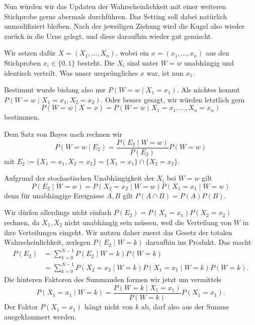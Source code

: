 \documentclass[8pt]{beamer}
\newcommand{\parspace}{\vspace{0.8em}}
\begin{document}
\begin{frame}
Nun würden wir das Updaten der Wahrscheinlichkeit mit einer weiteren
Stichprobe gerne abermals durchführen. Das Setting soll dabei natürlich
unmodifiziert bleiben. Nach der jeweiligen Ziehung wird die Kugel also
wieder zurück in die Urne gelegt, und diese daraufhin wieder gut gemischt.\pause

\parspace
Wir setzen dafür $X=(X_1,\ldots,X_n)$, wobei ein $x=(x_1,\ldots,x_n)$
aus den Stichproben $x_i\in\{0,1\}$ besteht. Die $X_i$ sind unter $W=w$
unabhängig und identisch verteilt. Was unser ursprüngliches $x$ war,
ist nun $x_1$.\pause

\parspace
Bestimmt wurde bislang also nur $P(W=w\mid X_1=x_1)$. Als nächtes kommt
$P(W=w\mid X_1=x_1, X_2=x_2)$. Oder besser gesagt, wir würden letztlich gern
\[P(W=w\mid X=x) = P(W=w\mid X_1=x_1,\ldots, X_n=x_n)\]
bestimmen.
\end{frame}

\begin{frame}
Dem Satz von Bayes nach rechnen wir
\[P(W=w\mid E_2) = \frac{P(E_2\mid W=w)}{P(E_2)}P(W=w)\]
mit $E_2 := \{X_1=x_1,X_2=x_2\} = \{X_1=x_1\}\cap\{X_2=x_2\}$.\pause

\parspace
Aufgrund der stochastischen Unabhängigkeit der $X_i$ bei $W=w$ gilt
\[P(E_2\mid W=w) = P(X_2=x_2\mid W=w)P(X_1=x_1\mid W=w)\]
denn für unabhängige Ereignisse $A,B$ gilt $P(A\cap B)=P(A)P(B)$.
\end{frame}

\begin{frame}
Wir dürfen allerdings nicht einfach $P(E_2)=P(X_1=x_1)P(X_2=x_2)$
rechnen, da $X_1,X_2$ nicht unabhängig sein müssen, weil die Verteilung
von $W$ in ihre Verteilungen eingeht. Wir nutzen daher zuerst das Gesetz
der totalen Wahrscheinlichkeit, zerlegen $P(E_2\mid W=k)$ daraufhin ins
Produkt. Das macht
\begin{align*}
P(E_2) &= \sum_{k=0}^{N-1}P(E_2\mid W=k)P(W=k)\\
&= \sum_{k=0}^{N-1} P(X_2=x_2\mid W=k)P(X_1=x_1\mid W=k)P(W=k).
\end{align*}\pause
Die hinteren Faktoren des Summanden formen wir jetzt um vermittels
\[P(X_1=x_1\mid W=k) = \frac{P(W=k\mid X_1=x_1)}{P(W=k)}P(X_1=x_1).\]
Der Faktor $P(X_1=x_1)$ hängt nicht von $k$ ab, darf also aus der Summe
ausgeklammert werden.
\end{frame}
\end{document}
